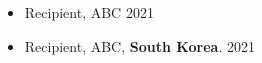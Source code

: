  \begin{itemize}[leftmargin=*,nosep]
\item Recipient, ABC 	\hfill			2021
\item Recipient, ABC, \textbf{South Korea}.	\hfill			2021
\end{itemize}

